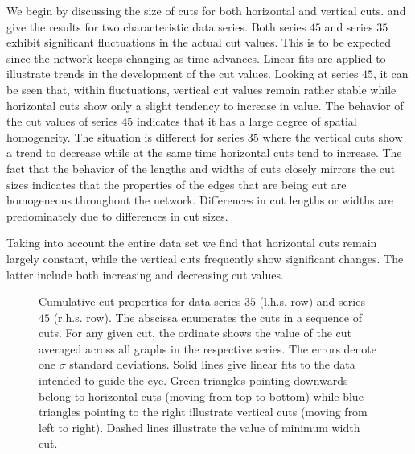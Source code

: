 		We begin by discussing the size of cuts for both horizontal and vertical cuts.  and  give the results for two characteristic data series. Both series $45$ and series $35$ exhibit significant fluctuations in the actual cut values. This is to be expected since the network keeps changing as time advances. Linear fits are applied to illustrate trends in the development of the cut values. Looking at series $45$, it can be seen that, within fluctuations, vertical cut values remain rather stable while horizontal cuts show only a slight tendency to increase in value. The behavior of the cut values of series $45$ indicates that it has a large degree of spatial homogeneity. The situation is different for series $35$ where the vertical cuts show a trend to decrease while at the same time horizontal cuts tend to increase. The fact that the behavior of the lengths and widths of cuts closely mirrors the cut sizes indicates that the properties of the edges that are being cut are homogeneous throughout the network. Differences in cut lengths or widths are predominately due to differences in cut sizes.

		Taking into account the entire data set we find that horizontal cuts remain largely constant, while the vertical cuts frequently show significant changes. The latter include both increasing and decreasing cut values.

		\begin{figure}
			\centering
			\newline
			\newline
			
			\caption[Cut properties.]{Cumulative cut properties for data series $35$ (l.h.s. row) and series $45$ (r.h.s. row). The abscissa enumerates the cuts in a sequence of cuts. For any given cut, the ordinate shows the value of the cut averaged across all graphs in the respective series. The errors denote one $\sigma$ standard deviations. Solid lines give linear fits to the data intended to guide the eye. Green triangles pointing downwards belong to horizontal cuts (moving from top to bottom) while blue triangles pointing to the right illustrate vertical cuts (moving from left to right). Dashed lines illustrate the value of minimum width cut.}
			\label{fig:cuts}
		\end{figure}

